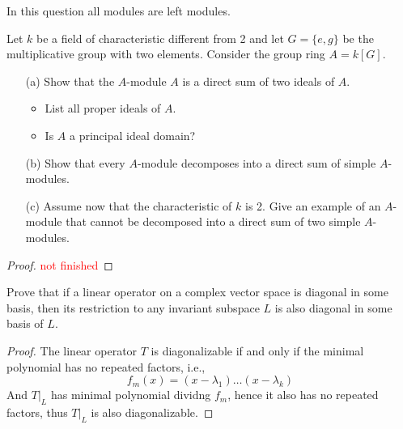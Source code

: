 \begin{prob}[F2018-Q4]
    In this question all modules are left modules.

Let \( k \) be a field of characteristic different from 2 and let \( G = \{e, g\} \) be the multiplicative group with two elements. Consider the group ring \( A = k[G] \).

\begin{enumerate}
    \item[(a)] Show that the \( A \)-module \( A \) is a direct sum of two ideals of \( A \).
    \begin{itemize}
        \item List all proper ideals of \( A \).
        \item Is \( A \) a principal ideal domain?
    \end{itemize}
    
    \item[(b)] Show that every \( A \)-module decomposes into a direct sum of simple \( A \)-modules.
    
    \item[(c)] Assume now that the characteristic of \( k \) is 2. Give an example of an \( A \)-module that cannot be decomposed into a direct sum of two simple \( A \)-modules.
\end{enumerate}
\end{prob}
\begin{proof}
    \textcolor{red}{not finished}
\end{proof}


\begin{prob}[S2003-Q3]
    Prove that if a linear operator on a complex vector space is diagonal in some basis, then its restriction to any invariant subspace \( L \) is also diagonal in some basis of \( L \).
\end{prob}
\begin{proof}
    The linear operator $T$ is diagonalizable if and only if the minimal polynomial has no repeated factors, i.e., 
    \begin{equation*}
        f_m(x)=(x-\lambda_1)\dots(x-\lambda_k)
    \end{equation*}
    And $T\vert_L$ has minimal polynomial dividng $f_m$, hence it also has no repeated factors, thus $T\vert_L$ is also diagonalizable.
\end{proof}




